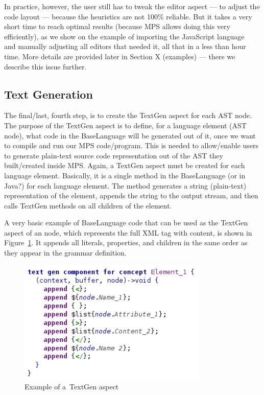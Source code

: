 In practice, however, the user still has to tweak the editor aspect --- to adjust the code layout --- because the heuristics are not 100\% reliable.
But it takes a very short time to reach optimal results (because MPS allows doing this very efficiently), as we show on the example of importing the JavaScript language~\cite{ref:javascript} and manually adjusting all editors that needed it, all that in a less than hour time.
More details are provided later in Section X (examples) --- there we describe this issue further.

\subsection{Text Generation}

The final/last, fourth step, is to create the TextGen aspect for each AST node.
The purpose of the TextGen aspect is to define, for a language element (AST node), what code in the BaseLanguage will be generated out of it, once we want to compile and run our MPS code/program.
This is needed to allow/enable users to generate plain-text source code representation out of the AST they built/created inside MPS.
Again, a TextGen aspect must be created for each language element.
Basically, it is a single method in the BaseLanguage (or in Java?) for each language element.
The method generates a string (plain-text) representation of the element, appends the string to the output stream, and then calls TextGen methods on all children of the element.

A very basic example of BaseLanguage code that can be used as the TextGen aspect of an  node, which represents the full XML tag with content, is shown in Figure~\ref{fig:textgen_example}.
It appends all literals, properties, and children in the same order as they appear in the grammar definition.

\begin{figure}[ht]
	\centering
	\includegraphics[width=90mm]{./images/textgen_example.png}
	\caption{Example of a~TextGen aspect}
	\label{fig:textgen_example}
\end{figure}

